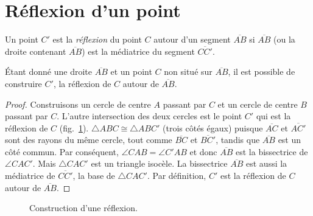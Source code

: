 
\section{Réflexion d'un point}\label{s.reflection}

\begin{definition}
Un point $C'$ est la \emph{réflexion} du point $C$ autour d'un segment  $\overline{AB}$ si $\overline{AB}$ (ou la droite contenant $\overline{AB}$) est la médiatrice du segment $\overline{CC'}$.
\end{definition}

\begin{theorem}\label{thm.compass-reflection}
Étant donné une droite $\overline{AB}$ et un point $C$ non situé sur $\overline{AB}$, il est possible de construire $C'$, la réflexion de $C$ autour de $\overline{AB}$.
\end{theorem}

\begin{proof} 
Construisons un cercle de centre $A$ passant par $C$ et un cercle de centre $B$ passant par $C$. L'autre intersection des deux cercles est le point $C'$ qui est la réflexion de $C$ (fig.~\ref{f.compass-reflection}).
$\triangle ABC \cong \triangle ABC'$ (trois côtés égaux) puisque $\overline{AC}$ et $\overline{AC'}$ sont des rayons du même cercle, tout comme $\overline{BC}$ et $\overline{BC'}$, tandis que  $\overline{AB}$ est un côté commun. Par conséquent, $\angle CAB = \angle C'AB$ et donc $\overline{AB}$ est la bissectrice de $\angle CAC'$. Mais $\triangle CAC'$ est un triangle isocèle. La bissectrice  $\overline{AB}$ est aussi la médiatrice de $\overline{CC'}$, la base de $\triangle CAC'$. Par définition, $C'$ est la réflexion de $C$ autour de $\overline{AB}$.
\end{proof}

\begin{figure}[t]
\centering
{}
\caption{Construction d'une réflexion.}\label{f.compass-reflection}
\end{figure}


